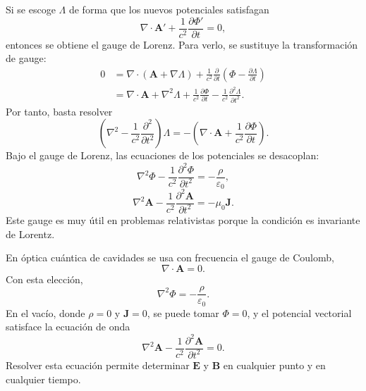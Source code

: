 \documentclass[11pt]{article}
\newcommand{\vb}[1]{\mathbf{#1}}
\begin{document}
Si se escoge $\Lambda$ de forma que los nuevos potenciales satisfagan
\begin{equation}
  \nabla\cdot\vb A'
  +
  \frac{1}{c^2}\frac{\partial\Phi'}{\partial t}
  =
  0,
\end{equation}
entonces se obtiene el gauge de Lorenz. Para verlo, se sustituye la
transformaci\'on de gauge:
\begin{align}
  0
  &=
  \nabla\cdot(\vb A+\nabla\Lambda)
  +
  \frac{1}{c^2}
  \frac{\partial}{\partial t}
  \left(
  \Phi-\frac{\partial\Lambda}{\partial t}
  \right)\\
  &=
  \nabla\cdot\vb A
  +
  \nabla^2\Lambda
  +
  \frac{1}{c^2}\frac{\partial\Phi}{\partial t}
  -
  \frac{1}{c^2}
  \frac{\partial^2\Lambda}{\partial t^2}.
\end{align}
Por tanto, basta resolver
\begin{equation}
  \left(
  \nabla^2-\frac{1}{c^2}\frac{\partial^2}{\partial t^2}
  \right)\Lambda
  =
  -
  \left(
  \nabla\cdot\vb A
  +
  \frac{1}{c^2}\frac{\partial\Phi}{\partial t}
  \right).
\end{equation}
Bajo el gauge de Lorenz, las ecuaciones de los potenciales se desacoplan:
\begin{equation}
  \nabla^2\Phi
  -
  \frac{1}{c^2}
  \frac{\partial^2\Phi}{\partial t^2}
  =
  -\frac{\rho}{\varepsilon_0},
\end{equation}
\begin{equation}
  \nabla^2\vb A
  -
  \frac{1}{c^2}
  \frac{\partial^2\vb A}{\partial t^2}
  =
  -\mu_0\vb J.
\end{equation}
Este gauge es muy \'util en problemas relativistas porque la condici\'on es
invariante de Lorentz.

En \'optica cu\'antica de cavidades se usa con frecuencia el gauge de
Coulomb,
\begin{equation}
  \nabla\cdot\vb A=0.
\end{equation}
Con esta elecci\'on,
\begin{equation}
  \nabla^2\Phi=-\frac{\rho}{\varepsilon_0}.
\end{equation}
En el vac\'io, donde $\rho=0$ y $\vb J=0$, se puede tomar $\Phi=0$, y el
potencial vectorial satisface la ecuaci\'on de onda
\begin{equation}
  \boxed{
  \nabla^2\vb A
  -
  \frac{1}{c^2}
  \frac{\partial^2\vb A}{\partial t^2}
  =
  0.
  }
\end{equation}
Resolver esta ecuaci\'on permite determinar $\vb E$ y $\vb B$ en cualquier
punto y en cualquier tiempo.
\end{document}
